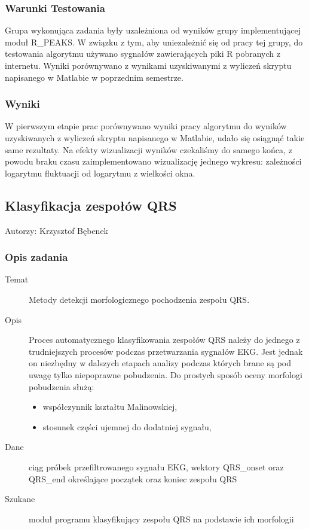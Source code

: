 \documentclass[a4paper, 11pt]{article}
\begin{document}
\subsubsection{Warunki Testowania}
\label{sec:dfa:tests}

Grupa wykonująca zadania były uzależniona od wyników grupy implementującej moduł R\_PEAKS. W związku z tym, aby uniezależnić się od pracy tej grupy, do testowania algorytmu używano sygnałów zawierających piki R pobranych z internetu. Wyniki porównywano z wynikami uzyskiwanymi z wyliczeń skryptu napisanego w Matlabie w poprzednim semestrze.

\subsubsection{Wyniki}
\label{sec:dfa:results}

W pierwszym etapie prac porównywano wyniki pracy algorytmu do wyników uzyskiwanych z wyliczeń skryptu napisanego w Matlabie, udało się osiągnąć takie same rezultaty. Na efekty wizualizacji wyników czekaliśmy do samego końca, z powodu braku czasu zaimplementowano wizualizację jednego wykresu: zależności logarytmu fluktuacji od logarytmu z wielkości okna.

\subsection{Klasyfikacja zespołów QRS}
\label{sec:qrs_class}
Autorzy: Krzysztof Bębenek

\subsubsection{Opis zadania}
\label{sec:qrs_class:desc}

\begin{description}
\item[Temat] Metody detekcji morfologicznego pochodzenia zespołu QRS.
\item[Opis] Proces automatycznego klasyfikowania zespołów QRS należy do jednego z trudniejszych procesów podczas przetwarzania sygnałów EKG. Jest jednak on niezbędny w dalszych etapach analizy podczas których brane są pod uwagę tylko niepoprawne pobudzenia. Do prostych sposób oceny morfologi pobudzenia służą:
  \begin{itemize}
  \item współczynnik kształtu Malinowskiej,
  \item stosunek części ujemnej do dodatniej sygnału,
  \end{itemize}
\item[Dane] ciąg próbek przefiltrowanego sygnału EKG, wektory QRS\_onset oraz QRS\_end określające początek oraz koniec zespołu QRS
\item[Szukane] moduł programu klasyfikujący zespołu QRS na podstawie ich morfologii 
\end{description}
\end{document}
